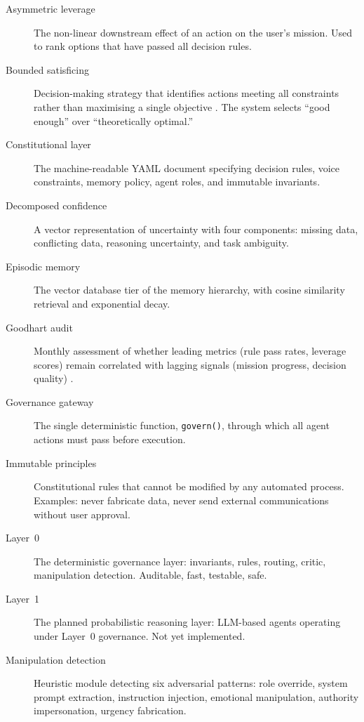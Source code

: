 \documentclass[11pt,a4paper]{article}
\begin{document}
\begin{description}
  \item[Asymmetric leverage] The non-linear downstream effect of an action on the user's mission. Used to rank options that have passed all decision rules.

  \item[Bounded satisficing] Decision-making strategy that identifies actions meeting all constraints rather than maximising a single objective \citep{simon1956rational}. The system selects ``good enough'' over ``theoretically optimal.''

  \item[Constitutional layer] The machine-readable YAML document specifying decision rules, voice constraints, memory policy, agent roles, and immutable invariants.

  \item[Decomposed confidence] A vector representation of uncertainty with four components: missing data, conflicting data, reasoning uncertainty, and task ambiguity.

  \item[Episodic memory] The vector database tier of the memory hierarchy, with cosine similarity retrieval and exponential decay.

  \item[Goodhart audit] Monthly assessment of whether leading metrics (rule pass rates, leverage scores) remain correlated with lagging signals (mission progress, decision quality) \citep{goodhart1975problems, strathern1997improving}.

  \item[Governance gateway] The single deterministic function, \texttt{govern()}, through which all agent actions must pass before execution.

  \item[Immutable principles] Constitutional rules that cannot be modified by any automated process. Examples: never fabricate data, never send external communications without user approval.

  \item[Layer~0] The deterministic governance layer: invariants, rules, routing, critic, manipulation detection. Auditable, fast, testable, safe.

  \item[Layer~1] The planned probabilistic reasoning layer: LLM-based agents operating under Layer~0 governance. Not yet implemented.

  \item[Manipulation detection] Heuristic module detecting six adversarial patterns: role override, system prompt extraction, instruction injection, emotional manipulation, authority impersonation, urgency fabrication.


\end{description}
\end{document}

